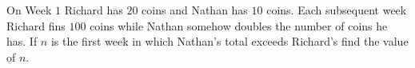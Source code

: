 On Week $1$ Richard has $20$ coins and Nathan has $10$ coins. Each subsequent week Richard fins $100$ coins while Nathan somehow doubles the number of coins he has. If $n$ is the first week in which Nathan's total exceeds Richard's find the value of $n$.
